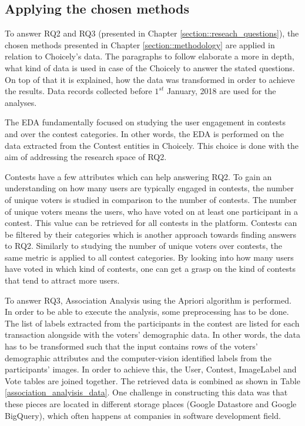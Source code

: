     \subsection{Applying the chosen methods}
    To answer RQ2 and RQ3 (presented in Chapter \ref{section::reseach_questions}), the chosen methods presented in Chapter \ref{section::methodology} are applied in relation to Choicely's data. The paragraphs to follow elaborate a more in depth, what kind of data is used in case of the Choicely to answer the stated questions. On top of that it is explained, how the data was transformed in order to achieve the results. Data records collected before $1^{st}$ January, 2018 are used for the analyses. 

    The EDA fundamentally focused on studying the user engagement in contests and over the contest categories. In other words, the EDA is performed on the data extracted from the Contest entities in Choicely. This choice is done with the aim of addressing the research space of RQ2.
    
    Contests have a few attributes which can help answering RQ2. To gain an understanding on how many users are typically engaged in contests, the number of unique voters is studied in comparison to the number of contests. The number of unique voters means the users, who have voted on at least one participant in a contest. This value can be retrieved for all contests in the platform. Contests can be filtered by their categories which is another approach towards finding answers to RQ2. Similarly to studying the number of unique voters over contests, the same metric is applied to all contest categories. By looking into how many users have voted in which kind of contests, one can get a grasp on the kind of contests that tend to attract more users.

    To answer RQ3, Association Analysis using the Apriori algorithm is performed. In order to be able to execute the analysis, some preprocessing has to be done. The list of labels extracted from the participants in the contest are listed for each transaction alongside with the voters' demographic data. In other words, the data has to be transformed such that the input contains rows of the voters' demographic attributes and the computer-vision identified labels from the participants' images. In order to achieve this, the User, Contest, ImageLabel and Vote tables are joined together. The retrieved data is combined as shown in Table \ref{association_analyisis_data}. One challenge in constructing this data was that these pieces are located in different storage places (Google Datastore and Google BigQuery), which often happens at companies in software development field. 

